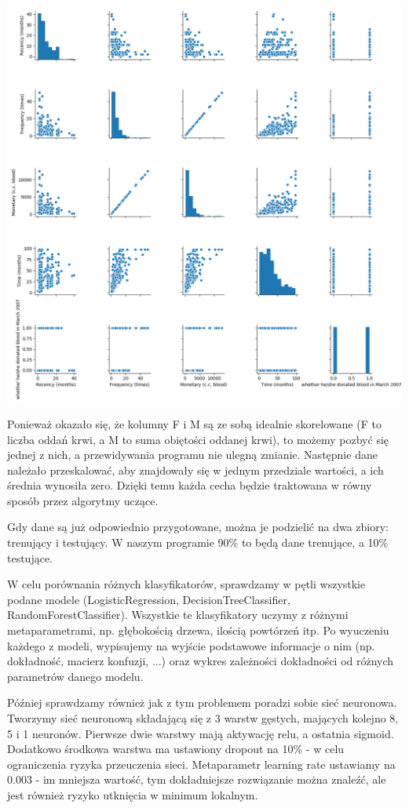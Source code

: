 \documentclass[11pt, a4paper, notitlepage]{report}
\begin{document}
\includegraphics[width=400pt,height=400pt]{graphics/correlation_2} \\

Ponieważ okazało się, że kolumny F i M są ze sobą idealnie skorelowane (F to liczba oddań krwi, a M to suma obiętości oddanej krwi), to możemy pozbyć się jednej z nich, a przewidywania programu nie ulegną zmianie.
Następnie dane należało przeskalować, aby znajdowały się w jednym przedziale wartości, a ich średnia wynosiła zero.
Dzięki temu każda cecha będzie traktowana w równy sposób przez algorytmy uczące.


Gdy dane są już odpowiednio przygotowane, można je podzielić na dwa zbiory: trenujący i testujący.
W naszym programie 90\% to będą dane trenujące, a 10\% testujące.

W celu porównania różnych klasyfikatorów, sprawdzamy w pętli wszystkie podane modele (LogisticRegression, DecisionTreeClassifier, RandomForestClassifier).
Wszystkie te klasyfikatory uczymy z różnymi metaparametrami, np. głębokością drzewa, ilością powtórzeń itp.
Po wyuczeniu każdego z modeli, wypisujemy na wyjście podstawowe informacje o nim (np. dokładność, macierz konfuzji, ...) oraz wykres zależności dokładności od różnych parametrów danego modelu.

Później sprawdzamy również jak z tym problemem poradzi sobie sieć neuronowa.
Tworzymy sieć neuronową składającą się z 3 warstw gęstych, mających kolejno 8, 5 i 1 neuronów.
Pierwsze dwie warstwy mają aktywację relu, a ostatnia sigmoid.
Dodatkowo środkowa warstwa ma ustawiony dropout na 10\% - w celu ograniczenia ryzyka przeuczenia sieci.
Metaparametr learning rate ustawiamy na 0.003 - im mniejsza wartość, tym dokładniejsze rozwiązanie można znaleźć, ale jest również ryzyko utknięcia w minimum lokalnym.
\end{document}
